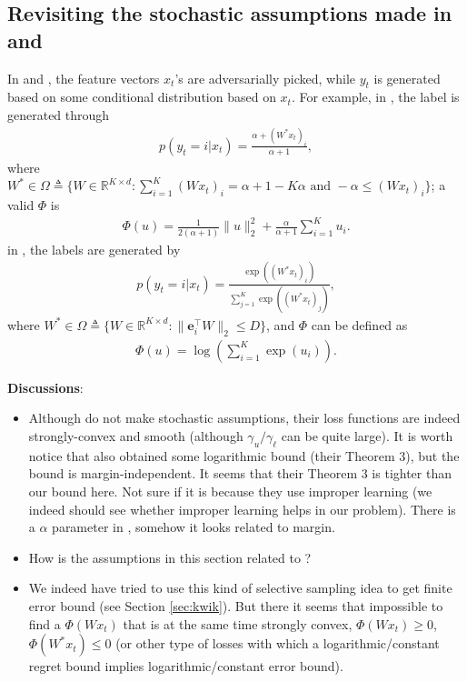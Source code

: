 \documentclass{article}
\newcommand{\e}{\mathbf{e}}
\begin{document}
\subsection{Revisiting the stochastic assumptions made in \cite{crammer2013multiclass} and \cite{agarwal2013selective}}
In \cite{crammer2013multiclass} and \cite{agarwal2013selective}, the feature vectors $x_t$'s are adversarially picked, while $y_t$ is generated based on some conditional distribution based on $x_t$. For example, in \cite{crammer2013multiclass}, the label is generated through 
\begin{align}
    p(y_t = i | x_t) = \frac{\alpha + (W^*x_t)_i}{\alpha+1}, \label{eqn:confidit assumption}
\end{align}
where $W^* \in \Omega \triangleq \{W\in \mathbb{R}^{K\times d}: \sum_{i=1}^K (Wx_t)_i = \alpha+1-K\alpha \text{\ and\ } -\alpha \leq (Wx_t)_i\}$; a valid $\Phi$ is 
\begin{align}
    \Phi(u) = \frac{1}{2(\alpha+1)}\|u\|_2^2 + \frac{\alpha}{\alpha+1}\sum_{i=1}^K u_i. 
\end{align}
in \cite{agarwal2013selective}, the labels are generated by 
\begin{align}
    p(y_t = i | x_t) = \frac{\exp((W^*x_t)_i)}{\sum_{j=1}^K \exp((W^*x_t)_j) },
\end{align}
where $W^* \in \Omega \triangleq \{W\in \mathbb{R}^{K\times d}: \|\e_i^\top W\|_2 \leq D \}$, and $\Phi$ can be defined as
\begin{align}
    \Phi(u) = \log\left(\sum_{i=1}^K \exp(u_i) \right). 
\end{align}

\textbf{Discussions}:  \\
\begin{itemize}
    \item Although \cite{hazan2011newtron, foster2018logistic} do not make stochastic assumptions, their loss functions are indeed strongly-convex and smooth (although $\gamma_u/\gamma_\ell$ can be quite large). It is worth notice that \cite{foster2018logistic} also obtained some logarithmic bound (their Theorem 3), but the bound is margin-independent. It seems that their Theorem 3 is tighter than our bound here. Not sure if it is because they use improper learning (we indeed should see whether improper learning helps in our problem). There is a $\alpha$ parameter in \cite{hazan2011newtron}, somehow it looks related to margin.
    \item How is the assumptions in this section related to \cite{pillaud2017exponential}? 
    \item We indeed have tried to use this kind of selective sampling idea to get finite error bound (see Section \ref{sec:kwik}). But there it seems that impossible to find a $\Phi(Wx_t)$ that is at the same time strongly convex, $\Phi(Wx_t)\geq 0$, $\Phi(W^*x_t)\leq 0$ (or other type of losses with which a logarithmic/constant regret bound implies logarithmic/constant error bound). 
\end{itemize}
\end{document}
